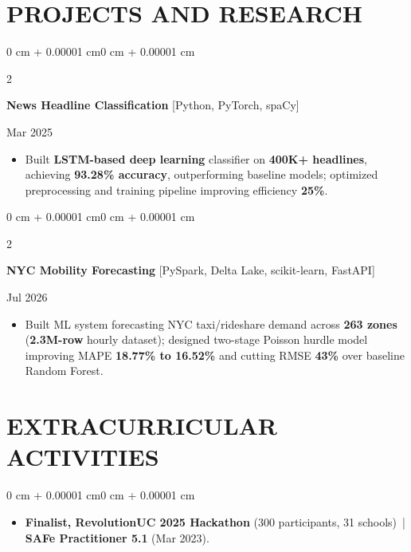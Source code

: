 \documentclass[10pt, letterpaper]{article}
\newenvironment{highlights}{
    \begin{itemize}[
        topsep=0.10 cm,
        parsep=0.06 cm,
        partopsep=0pt,
        itemsep=0.06 cm,
        leftmargin=12pt
    ]
}{
    \end{itemize}
}
\newenvironment{onecolentry}{
    \begin{adjustwidth}{0 cm + 0.00001 cm}{0 cm + 0.00001 cm}
}{
    \end{adjustwidth}
}
\newenvironment{twocolentry}[2][]{
    \onecolentry
    \def\secondColumn{#2}
    \setcolumnwidth{\fill, 4.5 cm}
    \begin{paracol}{2}
}{
    \switchcolumn \raggedleft \secondColumn
    \end{paracol}
    \endonecolentry
}
\begin{document}
\section{PROJECTS AND RESEARCH}
\begin{twocolentry}{Mar 2025}
\textbf{News Headline Classification} [Python, PyTorch, spaCy]
\end{twocolentry}
\begin{highlights}
  \item Built \textbf{LSTM-based deep learning} classifier on \textbf{400K+ headlines}, achieving \textbf{93.28\% accuracy}, outperforming baseline models; optimized preprocessing and training pipeline improving efficiency \textbf{25\%}.
\end{highlights}

\vspace{0.12 cm}

\begin{twocolentry}{Jul 2026}
\textbf{NYC Mobility Forecasting} [PySpark, Delta Lake, scikit-learn, FastAPI]
\end{twocolentry}
\begin{highlights}
  \item Built ML system forecasting NYC taxi/rideshare demand across \textbf{263 zones} (\textbf{2.3M-row} hourly dataset); designed two-stage Poisson hurdle model improving MAPE \textbf{18.77\% to 16.52\%} and cutting RMSE \textbf{43\%} over baseline Random Forest.
\end{highlights}

\section{EXTRACURRICULAR ACTIVITIES}
\begin{onecolentry}
\begin{highlights}
  \item \textbf{Finalist, RevolutionUC 2025 Hackathon} (300 participants, 31 schools) \,|\, \textbf{SAFe Practitioner 5.1} (Mar 2023).
\end{highlights}
\end{onecolentry}
\end{document}

